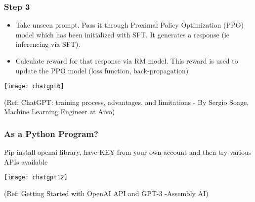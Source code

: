 

			
			
			


\begin{frame}[fragile]\frametitle{Step 3}

\begin{itemize}
\item Take unseen prompt. Pass it through Proximal Policy Optimization (PPO) model which has been initialized with SFT. It generates a response (ie inferencing via SFT).
\item Calculate reward for that response via RM model. This reward is used to update the PPO model (loss function, back-propagation)
\end{itemize}	 

			\begin{center}
			\texttt{[image: chatgpt6]}
			
			\end{center}		
			
			{\tiny (Ref: ChatGPT: training process, advantages, and limitations - By Sergio Soage, Machine Learning Engineer at Aivo)}
			
\end{frame}

\begin{frame}[fragile]\frametitle{As a Python Program?}
Pip install openai library, have KEY from your own account and then try various APIs available

			\begin{center}
			\texttt{[image: chatgpt12]}
			
			\end{center}		
			
			{\tiny (Ref: Getting Started with OpenAI API and GPT-3 -Assembly AI)}
			

\end{frame}

